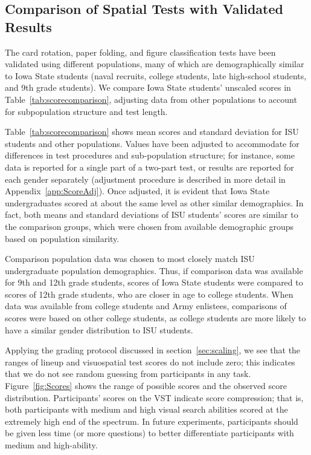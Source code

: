 \documentclass[journal]{vgtc}\usepackage[]{graphicx}\usepackage[]{color}
\begin{document}
\subsection{Comparison of Spatial Tests with Validated Results}
The card rotation, paper folding, and figure classification tests have been validated using different populations, many of which are demographically similar to Iowa State students (naval recruits, college students, late high-school students, and 9th grade students). We compare Iowa State students' unscaled scores in Table~\ref{tab:scorecomparison}, adjusting data from other populations to account for subpopulation structure and test length. 

Table~\ref{tab:scorecomparison} shows mean scores and standard deviation for ISU students and other populations. Values have been adjusted to accommodate for differences in test procedures and sub-population structure; for instance,  some data is reported for a single part of a two-part test, or results are reported for each gender separately (adjustment procedure is described in more detail in Appendix~\ref{app:ScoreAdj}). Once adjusted, it is evident that Iowa State undergraduates scored at about the same level as other similar demographics. In fact, both means and standard deviations of ISU students' scores are similar to the comparison groups, which were chosen from available demographic groups based on population similarity. 

Comparison population data was chosen to most closely match ISU undergraduate population demographics. Thus, if comparison data was available for 9th and 12th grade students, scores of Iowa State students were compared to scores of 12th grade students, who are closer in age to college students. When data was available from college students and Army enlistees, comparisons of scores were based on other college students, as college students are more likely to have a similar gender distribution to ISU students.

Applying the grading protocol discussed in section~\ref{sec:scaling}, we see that the ranges of lineup and visuospatial test scores do not include zero; this indicates that we do not see random guessing from participants in any task. Figure~\ref{fig:Scores} shows the range of possible scores and the observed score distribution. 
Participants' scores on the VST indicate score compression; that is, both participants with medium and high visual search abilities scored at the extremely high end of the spectrum. 
In future experiments, participants should be given less time (or more questions) to better differentiate participants with medium and high-ability.
\end{document}

